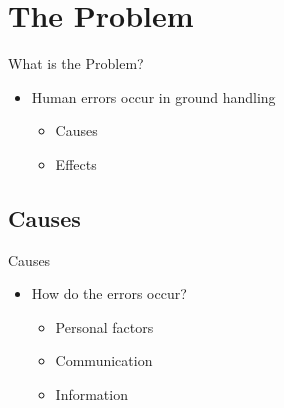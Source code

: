 \section{The Problem} 
\begin{frame}{What is the Problem?}
    \begin{itemize}
        \item{Human errors occur in ground handling}
        \begin{itemize}
            \item Causes
            \item Effects
        \end{itemize}
    \end{itemize}
\end{frame}

\subsection{Causes}
\begin{frame}{Causes}
    \begin{itemize}
        \item{How do the errors occur?}
        \begin{itemize}
            \item Personal factors
            \item Communication
            \item Information
        \end{itemize}
    \end{itemize}
\end{frame}